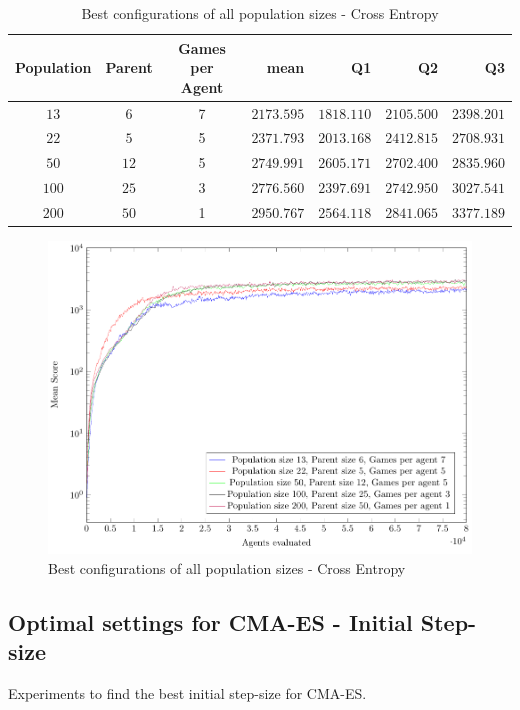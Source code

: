 \clearpage

\begin{table}[H]
\centering
\small
\begin{tabular}{c c c r r r r}
Population & Parent & Games per Agent & mean & Q1 & Q2 & Q3\\
\hline
$13$ & $6$ & 7 & $2173.595$ & $1818.110$ & $2105.500$ & $2398.201$\\
$22$ & $5$ & 5 & $2371.793$ & $2013.168$ & $2412.815$ & $2708.931$\\
$50$ & $12$ & 5 & $2749.991$ & $2605.171$ & $2702.400$ & $2835.960$\\
$100$ & $25$ & 3 & $2776.560$ & $2397.691$ & $2742.950$ & $3027.541$\\
$200$ & $50$ & 1 & $2950.767$ & $2564.118$ & $2841.065$ & $3377.189$\\
\end{tabular}
\caption{Best configurations of all population sizes - Cross Entropy}
\end{table}

\begin{figure}[H]
\centering
\includegraphics[scale=1]{data/ce_population_offspring/bestofall_population/PlotFile.pdf}
\caption{Best configurations of all population sizes - Cross Entropy}
\end{figure}

\clearpage

\subsection{Optimal settings for CMA-ES - Initial Step-size \label{appendixCMAInitialSigma}}
Experiments to find the best initial step-size for CMA-ES.

